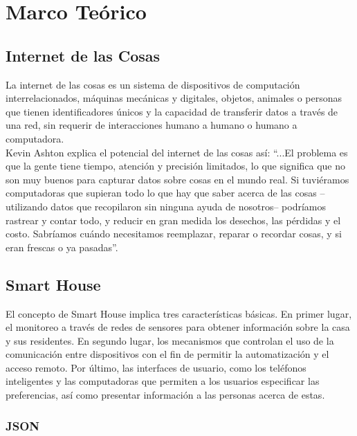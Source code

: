 \section{Marco Teórico}

\subsection{Internet de las Cosas}

La internet de las cosas es un sistema de dispositivos de computación interrelacionados, máquinas mecánicas y digitales, objetos, animales o personas que tienen identificadores únicos y la capacidad de transferir datos a través de una red, sin requerir de interacciones humano a humano o humano a computadora. \\

Kevin Ashton explica el potencial del internet de las cosas así: ``...El problema es que la gente tiene tiempo, atención y precisión limitados, lo que significa que no son muy buenos para capturar datos sobre cosas en el mundo real. Si tuviéramos computadoras que supieran todo lo que hay que saber acerca de las cosas –utilizando datos que recopilaron sin ninguna ayuda de nosotros– podríamos rastrear y contar todo, y reducir en gran medida los desechos, las pérdidas y el costo. Sabríamos cuándo necesitamos reemplazar, reparar o recordar cosas, y si eran frescas o ya pasadas”. \cite{Asthon2009} \\

\subsection{Smart House}

El concepto de Smart House implica tres características básicas. En primer lugar, el monitoreo a través de redes de sensores para obtener información sobre la casa y sus residentes. En segundo lugar, los mecanismos que controlan el uso de la comunicación entre dispositivos con el fin de permitir la automatización y el acceso remoto. Por último, las interfaces de usuario, como los teléfonos inteligentes y las computadoras que permiten a los usuarios especificar las preferencias, así como presentar información a las personas acerca de estas. \\

\subsubsection{JSON}

